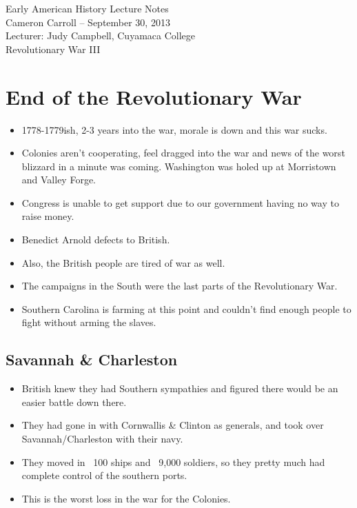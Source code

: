 \documentclass{article}
\begin{document}
  \begin{center}
    {\small{} Early American History Lecture Notes} \\[0.6cm]
    {\small{} Cameron Carroll -- September 30, 2013} \\[0.6cm]
    {\small{} Lecturer: Judy Campbell, Cuyamaca College}\\[1cm]
    {\small{} Revolutionary War III}\\[1cm]
  \end{center}
  
  \tableofcontents
  \newpage
  
  \section{End of the Revolutionary War}
  \begin{itemize}
    \item 1778-1779ish, 2-3 years into the war, morale is down and this war sucks. 
    \item Colonies aren't cooperating, feel dragged into the war and news of the worst blizzard in a minute was coming. Washington was holed up at Morristown and Valley Forge. 
    \item Congress is unable to get support due to our government having no way to raise money. 
    \item Benedict Arnold defects to British. 
    \item Also, the British people are tired of war as well.
    \item The campaigns in the South were the last parts of the Revolutionary War.    
    \item Southern Carolina is farming at this point and couldn't find enough people to fight without arming the slaves. 
  \end{itemize}
  \subsection{Savannah \& Charleston}
    \begin{itemize}
      \item British knew they had Southern sympathies and figured there would be an easier battle down there.
      \item They had gone in with Cornwallis \& Clinton as generals, and took over Savannah/Charleston with their navy.
      \item They moved in ~100 ships and ~9,000 soldiers, so they pretty much had complete control of the southern ports.
      \item This is the worst loss in the war for the Colonies.
    \end{itemize}
\end{document}

